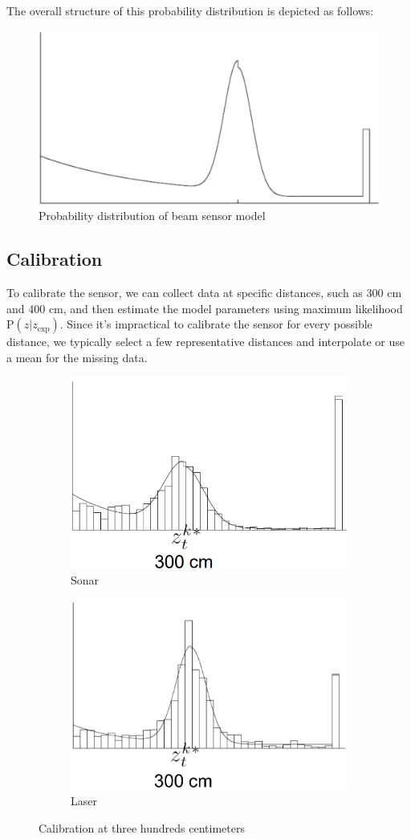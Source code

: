 The overall structure of this probability distribution is depicted as follows:
\begin{figure}[H]
    \centering
    \includegraphics[width=0.6\linewidth]{images/bsm.png}
    \caption{Probability distribution of beam sensor model}
\end{figure}

\subsection{Calibration}
To calibrate the sensor, we can collect data at specific distances, such as 300 cm and 400 cm, and then estimate the model parameters using maximum likelihood $\text{P}(z|z_{\text{exp}})$.
Since it's impractical to calibrate the sensor for every possible distance, we typically select a few representative distances and interpolate or use a mean for the missing data.
\begin{figure}[H]
    \centering
    \begin{subfigure}{0.49\textwidth}
        \centering
        \includegraphics[width=0.75\linewidth]{images/sonarcalib.png} 
        \caption{Sonar}
    \end{subfigure}
    \begin{subfigure}{0.49\textwidth}
        \centering
        \includegraphics[width=0.75\linewidth]{images/lasercalib.png}
        \caption{Laser}
    \end{subfigure}
    \caption{Calibration at three hundreds centimeters}
\end{figure}
